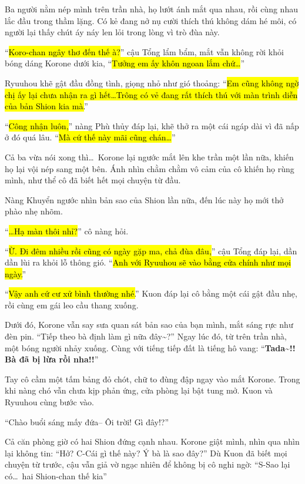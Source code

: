 \documentclass[../main.tex]{subfiles}
\begin{document}
Ba người nằm nép mình trên trần nhà, họ lướt ánh mắt qua nhau, rồi cùng nhau lắc đầu trong thầm lặng. Có kẻ đang nở nụ cười thích thú không dám hé môi, có người lại thấy chút áy náy len lỏi trong lòng vì trò đùa này.

``\hl{Koro-chan ngây thơ đến thế à?}'' cậu Tổng lẩm bẩm, mắt vẫn không rời khỏi bóng dáng Korone dưới kia, ``\hl{Tưởng em ấy khôn ngoan lắm chứ\dots}''

Ryuuhou khẽ gật đầu đồng tình, giọng nhỏ như gió thoảng: ``\hl{Em cũng không ngờ chị ấy lại chưa nhận ra gì hết\dots Trông có vẻ đang rất thích thú với màn trình diễn của bản Shion kia mà.}''

``\hl{Công nhận luôn,}'' nàng Phù thủy đáp lại, khẽ thở ra một cái ngáp dài vì đã nấp ở đó quá lâu. ``\hl{Mà cứ thế này mãi cũng chán\dots}''

Cả ba vừa nói xong thì\dots\ Korone lại ngước mắt lên khe trần một lần nữa, khiến họ lại vội nép sang một bên. Ánh nhìn chằm chằm vô cảm của cô khiến họ rùng mình, như thể cô đã biết hết mọi chuyện từ đầu.


Nàng Khuyển ngước nhìn bản sao của Shion lần nữa, đến lúc này họ mới thở phào nhẹ nhõm.

``\hl{\dots Hạ màn thôi nhỉ?}'' cô nàng hỏi.

``\hl{Ừ. Đi đêm nhiều rồi cũng có ngày gặp ma, chả đùa đâu,}'' cậu Tổng đáp lại, dần dần lùi ra khỏi lỗ thông gió. ``\hl{Anh với Ryuuhou sẽ vào bằng cửa chính như mọi ngày.}''

``\hl{Vậy anh cứ cư xử bình thường nhé.}'' Kuon đáp lại cô bằng một cái gật đầu nhẹ, rồi cùng em gái leo cầu thang xuống.

Dưới đó, Korone vẫn say sưa quan sát bản sao của bạn mình, mắt sáng rực như đèn pin. ``Tiếp theo bà định làm gì nữa đây\~{}?'' Ngay lúc đó, từ trên trần nhà, một bóng người nhảy xuống. Cùng với tiếng tiếp đất là tiếng hô vang: ``\textbf{Tada\~{}!! Bà đã bị lừa rồi nha!!}''


Tay cô cầm một tấm bảng đỏ chót, chữ to đùng đập ngay vào mắt Korone. Trong khi nàng chó vẫn chưa kịp phản ứng, cửa phòng lại bật tung mở. Kuon và Ryuuhou cùng bước vào.

``Chào buổi sáng mấy đứa-- Ôi trời! Gì đây!?''

Cả căn phòng giờ có hai Shion đứng cạnh nhau. Korone giật mình, nhìn qua nhìn lại không tin: ``Hở? C-Cái gì thế này? Ý bà là sao đây?'' Dù Kuon đã biết mọi chuyện từ trước, cậu vẫn giả vờ ngạc nhiên để không bị cô nghi ngờ: ``S-Sao lại có\dots\ hai Shion-chan thế kia''
\end{document}
